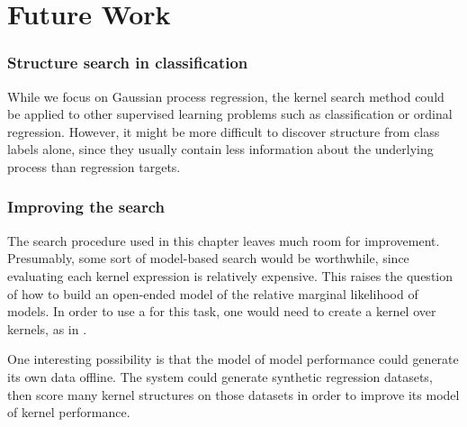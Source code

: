 \section{Future Work}

\subsubsection{Structure search in classification}
While we focus on Gaussian process regression, the kernel search method could be applied to other supervised learning problems such as classification or ordinal regression.
However, it might be more difficult to discover structure from class labels alone, since they usually contain less information about the underlying process than regression targets.

\subsubsection{Improving the search}
The search procedure used in this chapter leaves much room for improvement.
Presumably, some sort of model-based search would be worthwhile, since evaluating each kernel expression is relatively expensive.
This raises the question of how to build an open-ended model of the relative marginal likelihood of \gp{} models.
In order to use a \gp{} for this task, one would need to create a kernel over kernels, as in \citet{ong2002hyperkernels}.

One interesting possibility is that the model of model performance could generate its own data offline.
The system could generate synthetic regression datasets, then score many kernel structures on those datasets in order to improve its model of kernel performance.



